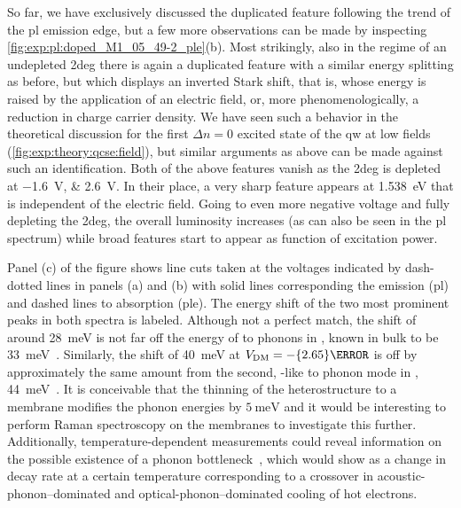 So far, we have exclusively discussed the duplicated feature following the trend of the \gls{pl} emission edge, but a few more observations can be made by inspecting \cref{fig:exp:pl:doped_M1_05_49-2_ple}(b).
Most strikingly, also in the regime of an undepleted \gls{2deg} there is again a duplicated feature with a similar energy splitting as before, but which displays an inverted Stark shift, that is, whose energy is raised by the application of an electric field, or, more phenomenologically, a reduction in charge carrier density.
We have seen such a behavior in the theoretical discussion for the first $\Delta n=0$ excited state of the \gls{qw} at low fields (\cref{fig:exp:theory:qcse:field}), but similar arguments as above can be made against such an identification.
Both of the above features vanish as the \gls{2deg} is depleted at \qtylist{-1.6;2.6}{\volt}.
In their place, a very sharp feature appears at \qty{1.538}{\electronvolt} that is independent of the electric field.
Going to even more negative voltage and fully depleting the \gls{2deg}, the overall luminosity increases (as can also be seen in the \gls{pl} spectrum) while broad features start to appear as function of excitation power.

Panel (c) of the figure shows line cuts taken at the voltages indicated by dash-dotted lines in panels (a) and (b) with solid lines corresponding the emission (\gls{pl}) and dashed lines to absorption (\gls{ple}).
The energy shift of the two most prominent peaks in both spectra is labeled.
Although not a perfect match, the shift of around \qty{28}{\milli\electronvolt} is not far off the energy of \acrshort{to} phonons in , known in bulk to be \qty{33}{\milli\electronvolt}~\cite{Strauch1990}.
Similarly, the shift of \qty{40}{\milli\electronvolt} at $\VDM=-\qty{2.65}{\volt}$ is off by approximately the same amount from the second, -like \acrshort{to} phonon mode in , \qty{44}{\milli\electronvolt}~\cite{Ilegems1970,Leng1989,Gammon1991}.
It is conceivable that the thinning of the heterostructure to a membrane modifies the phonon energies by $\qty{5}{\milli\electronvolt}$ and it would be interesting to perform Raman spectroscopy on the membranes to investigate this further.
Additionally, temperature-dependent measurements could reveal information on the possible existence of a phonon bottleneck~\cite{Murdin1997}, which would show as a change in decay rate at a certain temperature corresponding to a crossover in acoustic-phonon--dominated and optical-phonon--dominated cooling of hot electrons.

